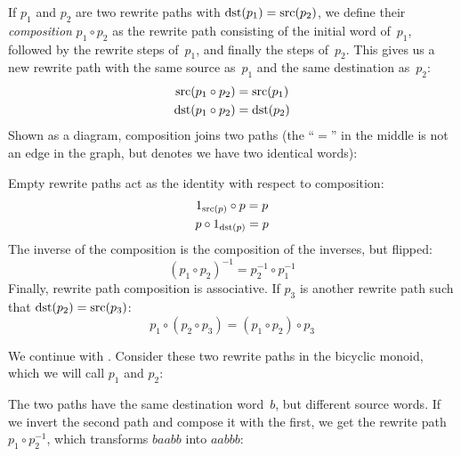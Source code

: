 \documentclass[../generics]{subfiles}
\begin{document}
\begin{definition}
%
If $p_1$ and $p_2$ are two rewrite paths with $\operatorname{dst}(p_1)=\operatorname{src}(p_2)$, we define their \emph{composition} \index{$\circ$}$p_1 \circ p_2$ as the rewrite path consisting of the initial word of~$p_1$, followed by the rewrite steps of~$p_1$, and finally the steps of~$p_2$. This gives us a new rewrite path with the same source as~$p_1$ and the same destination as~$p_2$:
\begin{gather*}
\operatorname{src}(p_1 \circ p_2) = \operatorname{src}(p_1)\\
\operatorname{dst}(p_1 \circ p_2) = \operatorname{dst}(p_2)
\end{gather*}
Shown as a diagram, composition joins two paths (the ``$=$'' in the middle is not an edge in the graph, but denotes we have two identical words):
\begin{center}
\end{center}
Empty rewrite paths act as the identity with respect to composition:
\begin{gather*}
1_{\operatorname{src}(p)}\circ p = p\\
p\circ 1_{\operatorname{dst}(p)} = p
\end{gather*}
The inverse of the composition is the composition of the inverses, but flipped:
\[(p_1 \circ p_2)^{-1} = p_2^{-1} \circ p_1^{-1}\]
Finally, rewrite path composition is associative. If $p_3$ is another rewrite path such that $\operatorname{dst}(p_2)=\operatorname{src}(p_3)$:
\[p_1 \circ (p_2 \circ p_3) = (p_1 \circ p_2) \circ p_3\]
\end{definition}

\begin{example}\label{bicyclic 4}
We continue with . Consider these two rewrite paths in the bicyclic monoid, which we will call $p_1$ and $p_2$:
\begin{center}
\end{center}
The two paths have the same destination word~$b$, but different source words. If we invert the second path and compose it with the first, we get the rewrite path $p_1 \circ p_2^{-1}$, which transforms $baabb$ into $aabbb$:
\begin{center}
\end{center}
\end{example}
\end{document}
